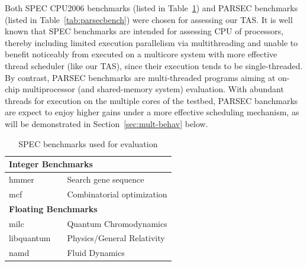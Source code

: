\documentclass[times, 10pt,twocolumn]{IEEEtran}
\begin{document}
Both SPEC CPU2006 benchmarks (listed in Table~\ref{tab:benchmarks}) and
PARSEC benchmarks (listed in Table~\ref{tab:parsecbench}) were chosen
for assessing our TAS.  It is well known that SPEC benchmarks are
intended for assessing CPU of processors, thereby including limited
execution parallelism via multithreading and unable to benefit noticeably 
from executed on
a multicore system with more effective thread scheduler (like our TAS),
since their execution tends to be single-threaded.  By contrast, PARSEC
benchmarks are multi-threaded programs aiming at on-chip multiprocessor
(and shared-memory system) evaluation.
With abundant threads for execution on the multiple cores of the testbed,
PARSEC banchmarks are expect to enjoy higher gains
under a more effective scheduling mechanism, as will be demonstrated in
Section~\ref{sec:mult-behav} below.

\newline
\begin{table}[tbph]
  \caption{SPEC benchmarks used for evaluation}
  \label{tab:benchmarks} 
\centering
\begin{tabular}{l c p{5cm}} 
\hline 
\hline
\multicolumn{3}{l}{\textbf{Integer Benchmarks}}\\
\hline 
hmmer &  & Search gene sequence \\
mcf &  & Combinatorial optimization \\
\hline 
\hline
\multicolumn{3}{l}{\textbf{Floating Benchmarks}}\\ 
\hline 
milc &  & Quantum Chromodynamics \\
libquantum &  & Physics/General Relativity \\
namd &  & Fluid Dynamics \\
\hline
\end{tabular} %

\end{table}
\end{document}
